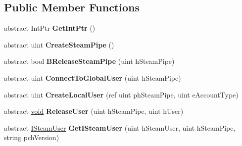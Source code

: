 \subsection*{Public Member Functions}
\begin{DoxyCompactItemize}
\item 
\hypertarget{classValve_1_1Steamworks_1_1ISteamClient_a89f2b94b10fb162175b201dbc8b5ae1a}{}abstract Int\+Ptr {\bfseries Get\+Int\+Ptr} ()\label{classValve_1_1Steamworks_1_1ISteamClient_a89f2b94b10fb162175b201dbc8b5ae1a}

\item 
\hypertarget{classValve_1_1Steamworks_1_1ISteamClient_aa101a23fe8850a35815ea18579e5d393}{}abstract uint {\bfseries Create\+Steam\+Pipe} ()\label{classValve_1_1Steamworks_1_1ISteamClient_aa101a23fe8850a35815ea18579e5d393}

\item 
\hypertarget{classValve_1_1Steamworks_1_1ISteamClient_a9ff5cf21692d028cebe85e8ca5daacf9}{}abstract bool {\bfseries B\+Release\+Steam\+Pipe} (uint h\+Steam\+Pipe)\label{classValve_1_1Steamworks_1_1ISteamClient_a9ff5cf21692d028cebe85e8ca5daacf9}

\item 
\hypertarget{classValve_1_1Steamworks_1_1ISteamClient_a3c4201b27b18b35eff16a2d11173f0ad}{}abstract uint {\bfseries Connect\+To\+Global\+User} (uint h\+Steam\+Pipe)\label{classValve_1_1Steamworks_1_1ISteamClient_a3c4201b27b18b35eff16a2d11173f0ad}

\item 
\hypertarget{classValve_1_1Steamworks_1_1ISteamClient_aeaee1708f23069b6fddfc5625ec17c4d}{}abstract uint {\bfseries Create\+Local\+User} (ref uint ph\+Steam\+Pipe, uint e\+Account\+Type)\label{classValve_1_1Steamworks_1_1ISteamClient_aeaee1708f23069b6fddfc5625ec17c4d}

\item 
\hypertarget{classValve_1_1Steamworks_1_1ISteamClient_ac6b5a8ef96593b68ddaa20727c47b1c7}{}abstract \hyperlink{SDL__audio_8h_a52835ae37c4bb905b903cbaf5d04b05f}{void} {\bfseries Release\+User} (uint h\+Steam\+Pipe, uint h\+User)\label{classValve_1_1Steamworks_1_1ISteamClient_ac6b5a8ef96593b68ddaa20727c47b1c7}

\item 
\hypertarget{classValve_1_1Steamworks_1_1ISteamClient_abb0b1a376f182532b967e1ae6f4439f1}{}abstract \hyperlink{classValve_1_1Steamworks_1_1ISteamUser}{I\+Steam\+User} {\bfseries Get\+I\+Steam\+User} (uint h\+Steam\+User, uint h\+Steam\+Pipe, string pch\+Version)\label{classValve_1_1Steamworks_1_1ISteamClient_abb0b1a376f182532b967e1ae6f4439f1}


\end{DoxyCompactItemize}
